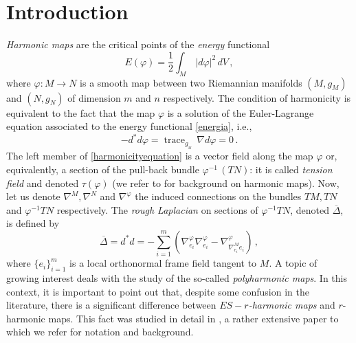 \documentclass[11pt]{amsart}
\theoremstyle{plain}
\theoremstyle{definition}
\numberwithin{equation}{section}
\DeclareMathOperator{\trace}{trace}
\numberwithin{equation}{section}
\begin{document}
\maketitle


\section{Introduction}\label{intro}



{\it Harmonic maps} are the critical points of the {\em energy} functional
\begin{equation}\label{energia}
E(\varphi)=\frac{1}{2}\int_{M}\,|d\varphi|^2\,dV\, ,
\end{equation}
where $\varphi:M\to N$ is a smooth map between two Riemannian
manifolds $(M,g_M)$ and $(N,g_N)$ of dimension $m$ and $n$ respectively. The condition of harmonicity is equivalent to the fact that the map $\varphi$ is a solution of the Euler-Lagrange equation associated to the energy functional \eqref{energia}, i.e.,
\begin{equation}\label{harmonicityequation}
  - d^* d \varphi =   {\trace}_{g_{_M}} \, \nabla d \varphi =0 \, .
\end{equation}
The left member of \eqref{harmonicityequation} is a vector field along the map $\varphi$ or, equivalently, a section of the pull-back bundle $\varphi^{-1} \, (TN)$: it is called {\em tension field} and denoted $\tau (\varphi)$ (we refer to \cite{EL83, EL1} for background on harmonic maps). 
Now, let us denote $\nabla^M, \nabla^N$ and $\nabla^{\varphi}$ the induced connections on the bundles $TM, TN$ and $\varphi ^{-1}TN$ respectively. The \textit{rough Laplacian} on sections of $\varphi^{-1}  TN$, denoted $\overline{\Delta}$, is defined by
\begin{equation*}
    \overline{\Delta}=d^* d =-\sum_{i=1}^m\left(\nabla^{\varphi}_{e_i}
    \nabla^{\varphi}_{e_i}-\nabla^{\varphi}_
    {\nabla^M_{e_i}e_i}\right)\,,
\end{equation*}
where $\{e_i\}_{i=1}^m$ is a local orthonormal frame field tangent to $M$.
A topic of growing interest deals with the study of the so-called {\it polyharmonic maps}. In this context, it is important to point out that, despite some confusion in the literature, there is a significant difference between {\it $ES-r$-harmonic maps} and $r$-harmonic maps. This fact was studied in detail in \cite{BMOR1}, a rather extensive paper to which we refer for notation and background. 
\end{document}
